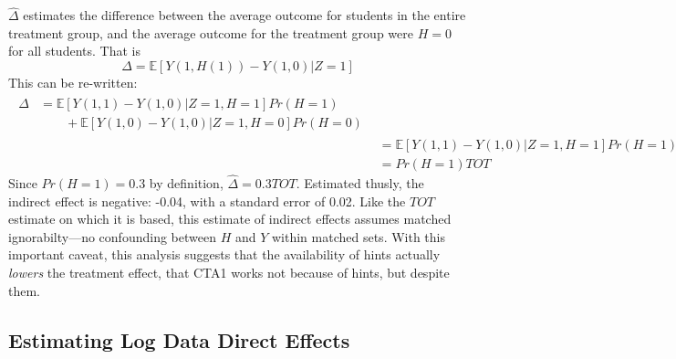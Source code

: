 \documentclass{article}\usepackage[]{graphicx}\usepackage[]{color}
\newcommand{\EE}{\mathbb{E}}
\begin{document}
$\hat{\Delta}$ estimates the difference between the average outcome
for students in the entire treatment group, and the average outcome
for the treatment group were $H=0$ for all students.
That is
\begin{equation*}
\Delta=\EE[Y(1,H(1))-Y(1,0)|Z=1]
\end{equation*}
This can be re-written:
\begin{align*}
\begin{split}
\Delta&=\EE[Y(1,1)-Y(1,0)|Z=1,H=1]Pr(H=1)\\
&\qquad +\EE[Y(1,0)-Y(1,0)|Z=1,H=0]Pr(H=0)
\end{split}
\\[2ex]
&=\EE[Y(1,1)-Y(1,0)|Z=1,H=1]Pr(H=1)\\
&=Pr(H=1)TOT
\end{align*}
Since $Pr(H=1)=$0.3 by definition,
$\hat{\Delta}=$0.3$TOT$.
Estimated thusly, the indirect effect is negative: -0.04, with
a standard error of 0.02.
Like the $TOT$ estimate on which it is based, this estimate of indirect effects assumes matched ignorabilty---no confounding between $H$ and $Y$ within matched sets.
With this important caveat, this analysis suggests that the availability of hints
actually \emph{lowers} the treatment effect, that CTA1 works not
because of hints, but despite them.

\subsection{Estimating Log Data Direct Effects}\label{sec:directEst}
\end{document}
